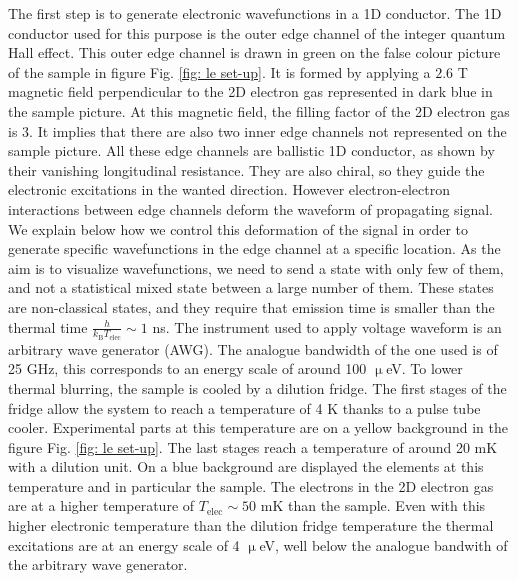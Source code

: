 The first step is to generate electronic wavefunctions in a 1D conductor.
The 1D conductor used for this purpose is the outer edge channel of the integer quantum Hall effect.
This outer edge channel is drawn in green on the false colour picture of the sample in figure Fig. \ref{fig: le set-up}.
It is formed by applying a $2.6$ T magnetic field perpendicular to the 2D electron gas represented in dark blue in the sample picture.
At this magnetic field, the filling factor of the 2D electron gas is $3$.
It implies that there are also two inner edge channels not represented on the sample picture.
All these edge channels are ballistic 1D conductor, as shown by their vanishing longitudinal resistance.
They are also chiral, so they guide the electronic excitations in the wanted direction.
However electron-electron interactions between edge channels \cite{ferraro2014real,freulon2015hong,marguerite2016decoherence} deform the waveform of propagating signal.
We explain below how we control this deformation of the signal in order to generate specific wavefunctions in the edge channel at a specific location.
As the aim is to visualize wavefunctions, we need to send a state with only few of them, and not a statistical mixed state between a large number of them.
These states are non-classical states, and they require that emission time is smaller than the thermal time $\frac{h}{k_{\mathrm{B}}T_{\mathrm{elec}}} \sim 1$ ns.
The instrument used to apply voltage waveform is an arbitrary wave generator (AWG).
The analogue bandwidth of the one used is of 25 GHz, this corresponds to an energy scale of around 100 $\upmu$eV.
To lower thermal blurring, the sample is cooled by a dilution fridge.
The first stages of the fridge allow the system to reach a temperature of 4 K thanks to a pulse tube cooler.
Experimental parts at this temperature are on a yellow background in the figure Fig. \ref{fig: le set-up}.
The last stages reach a temperature of around 20 mK with a dilution unit.
On a blue background are displayed the elements at this temperature and in particular the sample.
The electrons in the 2D electron gas are at a higher temperature of $T_{\mathrm{elec}} \sim 50$ mK than the sample.
Even with this higher electronic temperature than the dilution fridge temperature the thermal excitations are at an energy scale of 4 $\upmu$eV, well below the analogue bandwith of the arbitrary wave generator.

